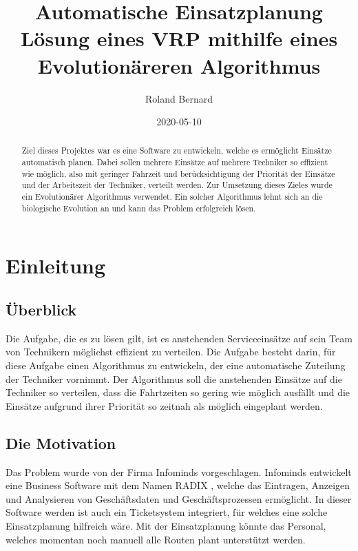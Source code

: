 \documentclass[a4paper,notitlepage,12pt]{report}
\title{Automatische Einsatzplanung \\
    \large Lösung eines VRP mithilfe eines Evolutionäreren Algorithmus}
\author{Roland Bernard}
\date{2020-05-10}
\begin{document}
\maketitle
\begin{abstract}

    Ziel dieses Projektes war es eine Software zu entwickeln, welche es ermöglicht
    Einsätze automatisch planen. Dabei sollen mehrere Einsätze auf mehrere Techniker
    so effizient wie möglich, also mit geringer Fahrzeit und berücksichtigung der
    Priorität der Einsätze und der Arbeitszeit der Techniker, verteilt werden. Zur
    Umsetzung dieses Zieles wurde ein Evolutionärer Algorithmus verwendet. Ein
    solcher Algorithmus lehnt sich an die biologische Evolution an und kann das
    Problem erfolgreich lösen.

\end{abstract}
\newpage

\tableofcontents
\newpage
{}
\listoffigures
\newpage
{}
\listoftables
\newpage
{}
\printnomenclature
\newpage

\chapter{Einleitung}

\section{Überblick}

Die Aufgabe, die es zu lösen gilt, ist es anstehenden Serviceeinsätze auf sein
Team von Technikern möglichst effizient zu verteilen. Die Aufgabe besteht
darin, für diese Aufgabe einen Algorithmus zu entwickeln, der eine automatische
Zuteilung der Techniker vornimmt. Der Algorithmus soll die anstehenden Einsätze
auf die Techniker so verteilen, dass die Fahrtzeiten so gering wie möglich ausfällt
und die Einsätze aufgrund ihrer Priorität so zeitnah als möglich eingeplant werden.

\section{Die Motivation}

Das Problem wurde von der Firma Infominds vorgeschlagen. Infominds entwickelt eine
Business Software mit dem Namen RADIX \cite{radix}, welche das Eintragen, Anzeigen und Analysieren
von Geschäftsdaten und Geschäftsprozessen ermöglicht. In dieser Software werden
ist auch ein Ticketsystem integriert, für welches eine solche Einsatzplanung
hilfreich wäre. Mit der Einsatzplanung könnte das Personal, welches momentan noch
manuell alle Routen plant unterstützt werden.
\end{document}
